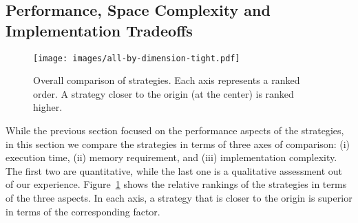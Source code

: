 
\subsection{Performance, Space Complexity and Implementation Tradeoffs}

\begin{figure}
\centering
\texttt{[image: images/all-by-dimension-tight.pdf]}
\caption{Overall comparison of strategies. Each axis represents a ranked order. A strategy closer to the origin (at the center) is ranked higher.}
\label{expt:overall}
\end{figure}

While the previous section focused on the performance aspects of the strategies, in this section we compare the strategies in terms of three axes of comparison: (i) execution time, (ii) memory requirement, and (iii) implementation complexity. The first two are quantitative, while the last one is a qualitative assessment out of our experience. Figure~\ref{expt:overall} shows the relative rankings of the strategies in terms of the three aspects. In each axis, a strategy that is closer to the origin is superior in terms of the corresponding factor.

